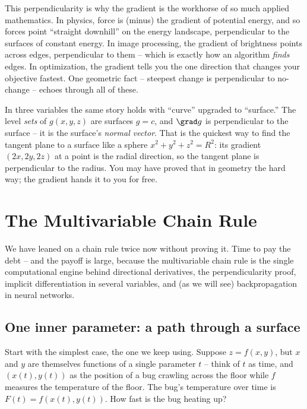 \begin{aestheticbox}
This perpendicularity is why the gradient is the workhorse of so much applied
mathematics. In physics, force is (minus) the gradient of potential energy, and so
forces point ``straight downhill'' on the energy landscape, perpendicular to the
surfaces of constant energy. In image processing, the gradient of brightness
points across edges, perpendicular to them -- which is exactly how an algorithm
\emph{finds} edges. In optimization, the gradient tells you the one direction that
changes your objective fastest. One geometric fact -- steepest change is
perpendicular to no-change -- echoes through all of these.
\end{aestheticbox}

\begin{connectionbox}
In three variables the same story holds with ``curve'' upgraded to ``surface.''
The level \emph{sets} of $g(x,y,z)$ are surfaces $g=c$, and $\grad g$ is
perpendicular to the surface -- it is the surface's \emph{normal vector}. That is
the quickest way to find the tangent plane to a surface like a sphere
$x^2+y^2+z^2=R^2$: its gradient $(2x,2y,2z)$ at a point is the radial direction,
so the tangent plane is perpendicular to the radius. You may have proved that in
geometry the hard way; the gradient hands it to you for free.
\end{connectionbox}

\section{The Multivariable Chain Rule}
\label{ch33:chain}

We have leaned on a chain rule twice now without proving it. Time to pay the debt
-- and the payoff is large, because the multivariable chain rule is the single
computational engine behind directional derivatives, the perpendicularity proof,
implicit differentiation in several variables, and (as we will see)
backpropagation in neural networks.

\subsection{One inner parameter: a path through a surface}

Start with the simplest case, the one we keep using. Suppose $z=f(x,y)$, but $x$
and $y$ are themselves functions of a single parameter $t$ -- think of $t$ as
time, and $(x(t),y(t))$ as the position of a bug crawling across the floor while
$f$ measures the temperature of the floor. The bug's temperature over time is
$F(t)=f(x(t),y(t))$. How fast is the bug heating up?

